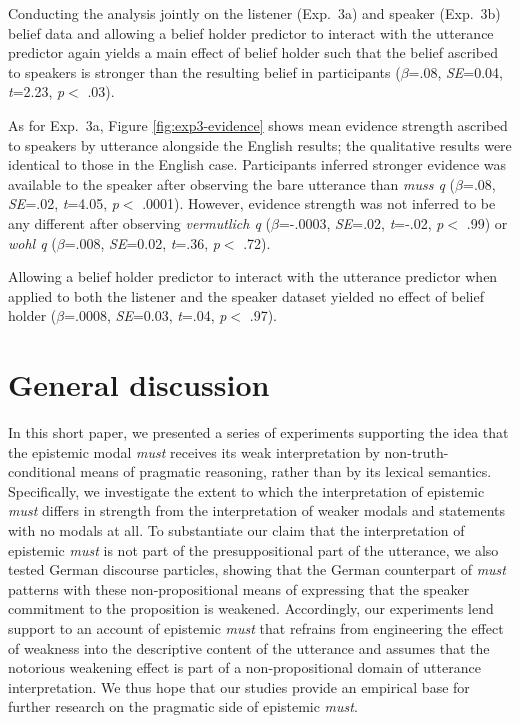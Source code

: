 \documentclass[11pt]{article}
\newcommand{\figref}[1]{Figure \ref{#1}}
\begin{document}
Conducting the analysis jointly on the listener (Exp.~3a) and speaker  (Exp.~3b) belief data and allowing a belief holder predictor to interact with the utterance predictor again yields a main effect of belief holder such that the belief ascribed to speakers is stronger than the resulting belief in participants ($\beta$=.08, \emph{SE}=0.04, \emph{t}=2.23, \emph{p}$<$ .03).

As for Exp.~3a, \figref{fig:exp3-evidence} shows mean evidence strength ascribed to speakers by utterance alongside the English results; the qualitative results were identical to those in the English case. Participants inferred stronger evidence was available to the speaker after observing the bare utterance than \emph{muss q} ($\beta$=.08, \emph{SE}=.02, \emph{t}=4.05, \emph{p}$<$ .0001). However, evidence strength was not inferred to be any different after observing \emph{vermutlich q} ($\beta$=-.0003, \emph{SE}=.02, \emph{t}=-.02, \emph{p}$<$ .99) or \emph{wohl q} ($\beta$=.008, \emph{SE}=0.02, \emph{t}=.36, \emph{p}$<$ .72).

Allowing a belief holder predictor to interact with the utterance predictor when applied to both the listener and the speaker dataset yielded no effect of belief holder ($\beta$=.0008, \emph{SE}=0.03, \emph{t}=.04, \emph{p}$<$ .97).

\section{General discussion}
In this short paper, we presented a series of experiments supporting the idea that the epistemic modal \emph{must} receives its weak interpretation by non-truth-conditional means of pragmatic reasoning, rather than by its lexical semantics. Specifically, we investigate the extent to which the interpretation of epistemic \emph{must} differs in strength from the interpretation of weaker modals and statements with no modals at all. To substantiate our claim that the interpretation of epistemic \emph{must} is not part of the presuppositional part of the utterance, we also tested German discourse particles, showing that the German counterpart of \emph{must} patterns with these non-propositional means of expressing that the speaker commitment to the proposition is weakened. Accordingly, our experiments lend support to an account of epistemic \emph{must} that refrains from engineering the effect of weakness into the descriptive content of the utterance and assumes that the notorious weakening effect is part of a non-propositional domain of utterance interpretation. We thus hope that our studies provide an empirical base for further research on the pragmatic side of epistemic \emph{must}.
\end{document}
